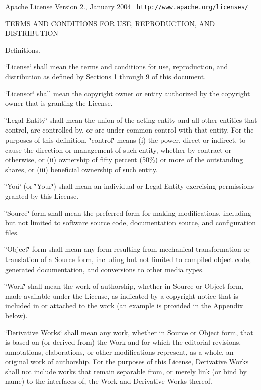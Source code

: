 Apache License Version 2., January 2004 \href{http://www.apache.org/licenses/}{\texttt{ http\+://www.\+apache.\+org/licenses/}}

TERMS AND CONDITIONS FOR USE, REPRODUCTION, AND DISTRIBUTION


\begin{DoxyEnumerate}
\item Definitions.
\end{DoxyEnumerate}

\char`\"{}\+License\char`\"{} shall mean the terms and conditions for use, reproduction, and distribution as defined by Sections 1 through 9 of this document.

\char`\"{}\+Licensor\char`\"{} shall mean the copyright owner or entity authorized by the copyright owner that is granting the License.

\char`\"{}\+Legal Entity\char`\"{} shall mean the union of the acting entity and all other entities that control, are controlled by, or are under common control with that entity. For the purposes of this definition, \char`\"{}control\char`\"{} means (i) the power, direct or indirect, to cause the direction or management of such entity, whether by contract or otherwise, or (ii) ownership of fifty percent (50\%) or more of the outstanding shares, or (iii) beneficial ownership of such entity.

\char`\"{}\+You\char`\"{} (or \char`\"{}\+Your\char`\"{}) shall mean an individual or Legal Entity exercising permissions granted by this License.

\char`\"{}\+Source\char`\"{} form shall mean the preferred form for making modifications, including but not limited to software source code, documentation source, and configuration files.

\char`\"{}\+Object\char`\"{} form shall mean any form resulting from mechanical transformation or translation of a Source form, including but not limited to compiled object code, generated documentation, and conversions to other media types.

\char`\"{}\+Work\char`\"{} shall mean the work of authorship, whether in Source or Object form, made available under the License, as indicated by a copyright notice that is included in or attached to the work (an example is provided in the Appendix below).

\char`\"{}\+Derivative Works\char`\"{} shall mean any work, whether in Source or Object form, that is based on (or derived from) the Work and for which the editorial revisions, annotations, elaborations, or other modifications represent, as a whole, an original work of authorship. For the purposes of this License, Derivative Works shall not include works that remain separable from, or merely link (or bind by name) to the interfaces of, the Work and Derivative Works thereof.

